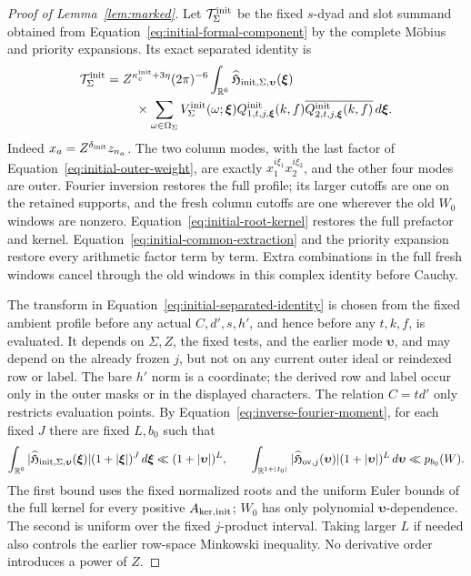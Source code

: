 \documentclass[12pt]{article}
\begin{document}
\begin{proof}[Proof of Lemma~\ref{lem:marked}]
Let \(\mathcal T_\Sigma^{\rm init}\) be the fixed \(s\)-dyad and
slot summand obtained from Equation~\eqref{eq:initial-formal-component}
by the complete M\"obius and priority expansions.  Its exact separated
identity is
\begin{equation}\label{eq:initial-separated-identity}
 \begin{split}
 \mathcal T_\Sigma^{\rm init}={}&
 Z^{\kappa_c^{\rm init}+3\eta}(2\pi)^{-6}
 \int_{\mathbb R^6}
 \widehat{\mathfrak H}_{{\rm init},\Sigma,\boldsymbol\upsilon}
       (\boldsymbol\xi)\\
 &\quad\times\sum_{\omega\in\Omega_\Sigma}
 V_\Sigma^{\rm init}(\omega;\boldsymbol\xi)
 Q^{\rm init}_{1,t,j,\boldsymbol\xi}(k,f)
 \overline{Q^{\rm init}_{2,t,j,\boldsymbol\xi}(k,f)}
 \,d\boldsymbol\xi.
 \end{split}
\end{equation}
Indeed \(x_a=Z^{\delta_{\rm init}}z_{n_a}\).  The two column modes,
with the last factor of Equation~\eqref{eq:initial-outer-weight},
are exactly \(x_1^{i\xi_1}x_2^{i\xi_2}\), and the other four modes
are outer.  Fourier inversion restores the full profile; its larger
cutoffs are one on the retained supports, and the fresh column
cutoffs are one wherever the old \(W_0\) windows are nonzero.
Equation~\eqref{eq:initial-root-kernel} restores the full prefactor
and kernel.  Equation~\eqref{eq:initial-common-extraction} and the
priority expansion restore every arithmetic factor term by term.
Extra combinations in the full fresh windows cancel through the old
windows in this complex identity before Cauchy.

The transform in Equation~\eqref{eq:initial-separated-identity}
is chosen from the fixed ambient profile before any actual
\(C,d',s,h'\), and hence before any \(t,k,f\), is evaluated.  It
depends on \(\Sigma,Z\), the fixed tests, and the earlier mode
\(\boldsymbol\upsilon\), and may depend on the already frozen \(j\),
but not on any current outer ideal or reindexed row or label.  The bare
\(h'\) norm is a coordinate; the derived row and label occur only
in the outer masks or in the displayed characters.  The relation
\(C=td'\) only restricts evaluation points.  By
Equation~\eqref{eq:inverse-fourier-moment}, for each fixed \(J\)
there are fixed \(L,b_0\) such that
\[
 \int_{\mathbb R^6}
 |\widehat{\mathfrak H}_{{\rm init},\Sigma,\boldsymbol\upsilon}
       (\boldsymbol\xi)|(1+|\boldsymbol\xi|)^J\,d\boldsymbol\xi
 \ll (1+|\boldsymbol\upsilon|)^L,\qquad
 \int_{\mathbb R^{1+|I_0|}}|\widehat{\mathfrak H}_{{\rm ov},j}(\boldsymbol\upsilon)|
       (1+|\boldsymbol\upsilon|)^L\,d\boldsymbol\upsilon
 \ll p_{b_0}(W).
\]
The first bound uses the fixed normalized roots and the uniform Euler
bounds of the full kernel for every positive
\(A_{{\rm ker},{\rm init}}\); \(W_0\) has only polynomial
\(\boldsymbol\upsilon\)-dependence.  The second is uniform over the
fixed \(j\)-product interval.  Taking larger \(L\) if needed also
controls the earlier row-space Minkowski inequality.  No derivative
order introduces a power of \(Z\).


\end{proof}
\end{document}
